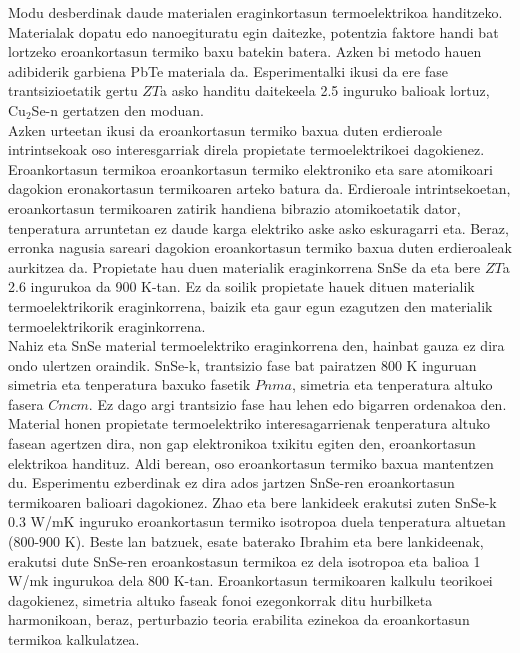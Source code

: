 Modu desberdinak daude materialen eraginkortasun termoelektrikoa handitzeko. Materialak 
dopatu\cite{kim2013engineered,pei2011stabilizing,heremans2008enhancement} edo 
nanoegituratu\cite{vineis2010nanostructured,minnich2009bulk} 
egin daitezke, potentzia faktore handi bat lortzeko eroankortasun termiko baxu batekin batera. Azken bi metodo 
hauen adibiderik garbiena PbTe materiala da. Esperimentalki ikusi da ere fase trantsizioetatik gertu $ZT$a asko handitu daitekeela\cite{liu2013ultrahigh} 2.5 inguruko balioak lortuz, Cu$_{2}$Se-n gertatzen den moduan. \\

Azken urteetan ikusi da eroankortasun termiko baxua duten erdieroale intrintsekoak oso interesgarriak direla 
propietate termoelektrikoei dagokienez\cite{zhao2014ultralow,he2018remarkable}. Eroankortasun termikoa eroankortasun 
termiko elektroniko eta sare atomikoari dagokion eronakortasun termikoaren arteko batura da. Erdieroale 
intrintsekoetan, eroankortasun termikoaren zatirik handiena bibrazio atomikoetatik dator, tenperatura arruntetan ez 
daude karga elektriko aske asko eskuragarri eta. Beraz, erronka nagusia sareari dagokion eroankortasun termiko baxua 
duten erdieroaleak aurkitzea da. Propietate hau duen materialik eraginkorrena SnSe\cite{zhao2014ultralow} da eta 
bere $ZT$a 2.6 ingurukoa da 900 K-tan. Ez da soilik propietate hauek dituen materialik termoelektrikorik 
eraginkorrena, baizik eta gaur egun ezagutzen den materialik termoelektrikorik eraginkorrena. \\

Nahiz eta SnSe material termoelektriko eraginkorrena den, hainbat gauza ez dira ondo ulertzen oraindik. SnSe-k, 
trantsizio fase bat pairatzen 800 K inguruan simetria eta tenperatura baxuko fasetik $Pnma$, simetria eta tenperatura 
altuko fasera $Cmcm$. Ez dago argi trantsizio fase hau lehen edo bigarren ordenakoa den\cite{zhao2014ultralow,
adouby1998structure,chattopadhyay1986neutron,chatterji2018soft}. Material honen propietate 
termoelektriko interesagarrienak tenperatura altuko fasean agertzen dira, non gap elektronikoa txikitu egiten den, 
eroankortasun elektrikoa handituz. Aldi berean, oso eroankortasun termiko baxua mantentzen du. Esperimentu ezberdinak
ez dira ados jartzen SnSe-ren eroankortasun termikoaren balioari dagokionez. Zhao eta bere 
lankideek\cite{zhao2014ultralow} erakutsi zuten SnSe-k 0.3 W/mK inguruko eroankortasun termiko isotropoa duela 
tenperatura altuetan (800-900 K). Beste lan 
batzuek\cite{ibrahim2017reinvestigation,sassi2014assessment,chen2014thermoelectric}, esate baterako Ibrahim eta bere 
lankideenak, erakutsi dute SnSe-ren eroankostasun termikoa ez dela isotropoa eta balioa 1 W/mk ingurukoa dela 
800 K-tan. Eroankortasun termikoaren kalkulu teorikoei dagokienez, simetria altuko faseak fonoi ezegonkorrak 
ditu hurbilketa harmonikoan\cite{dewandre2016two,skelton2016anharmonicity,yu2016enhanced}, beraz, perturbazio 
teoria erabilita ezinekoa da eroankortasun termikoa kalkulatzea. \\


